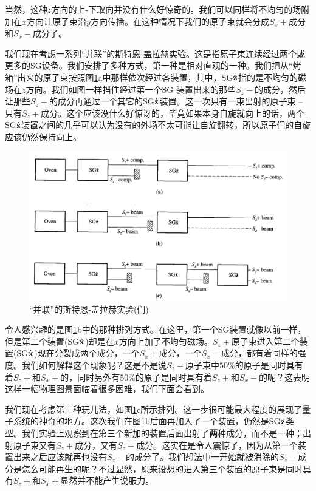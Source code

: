 \documentclass[UTF8,twoside]{ctexart}
\newcommand{\figref}[1]{图\ref{#1}}
\begin{document}
当然，这种$z$方向的上-下取向并没有什么好惊奇的。我们可以同样将不均匀的场附加在$x$方向让原子束沿$y$方向传播。在这种情况下我们的原子束就会分成$S_x+$成分和$S_x-$成分了。\\


\noindent 我们现在考虑一系列“并联”的斯特恩-盖拉赫实验。这是指原子束连续经过两个或更多的SG设备。我们安排了多种方式，第一种是相对直观的一种。我们把从“烤箱”出来的原子束按照图{\ref{Fig1.3}}a中那样依次经过各装置，其中，SG${\hat{\bf z}}$指的是不均匀的磁场在$z$方向。我们如图一样挡住经过第一个SG 装置出来的那些$S_z-$的成分，然后让那些$S_z+$的成分再通过一个其它的SG${\hat{\bf z}}$装置。这一次只有一束出射的原子束 -- 只有$S_z+$成分。这个应该没什么好惊讶的，毕竟如果本身自旋就向上的话，两个SG$\hat{\bf z}$装置之间的几乎可以认为没有的外场不太可能让自旋翻转，所以原子们的自旋应该仍然保持向上。

\begin{figure}
\begin{centering}
\includegraphics[width = 12cm]{./Sakurai/Fig_1.3.png}
\caption{“并联”的斯特恩-盖拉赫实验(们)}
\label {Fig1.3}
\end{centering}
\end{figure}

令人感兴趣的是图{\ref{Fig1.3}}b中的那种排列方式。在这里，第一个SG装置就像以前一样，但是第二个装置(SG$\hat{\bf x}$)却是在$x$方向上加了不均匀磁场。$S_z+$原子束进入第二个装置(SG$\hat{\bf x}$)现在分裂成两个成分，一个$S_x+$成分，一个$S_x-$成分，都有着同样的强度。我们如何解释这个现象呢？这是不是说$S_z+$原子束中$50\%$的原子是同时具有着$S_z+$和$S_x+$的，同时另外有$50\%$的原子是同时具有着$S_z+$和$S_x-$的呢？这表明这样一幅物理图景面临着很多困难，我们下面会看到。

我们现在考虑第三种玩儿法，如\figref{Fig1.3}c所示排列。这一步很可能最大程度的展现了量子系统的神奇的地方。这次我们在{\figref{Fig1.3}}b后面再加入了一个装置，仍然是SG$\hat{\bf z}$类型。我们实验上观察到在第三个新加的装置后面出射了{\textbf{两}}种成分，而不是一种；出射原子束又有$S_z+$成分，又有$S_z-$成分。这实在是令人震惊了，因为从第一个装置出来之后应该就再也没有$S_z-$的成分了。我们想法中一开始就被消除的$S_z-$成分是怎么可能再生的呢？不过显然，原来设想的进入第三个装置的原子束是同时具有$S_z+$和$S_x+$显然并不能产生说服力。
\end{document}
